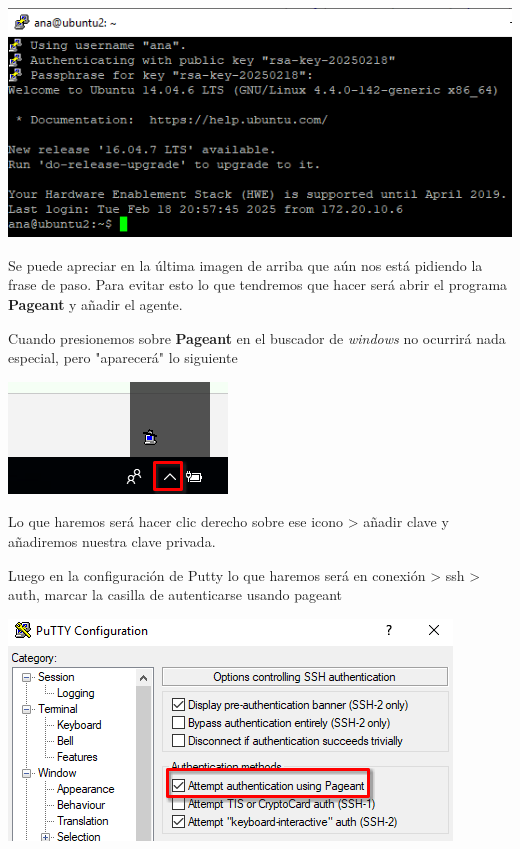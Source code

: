 \documentclass[11pt]{article}
\begin{document}
\begin{center}
\includegraphics[width=.9\linewidth]{./media/putty-connect-3.png}
\end{center}

Se puede apreciar en la última imagen de arriba que aún nos está pidiendo la frase de paso. Para evitar esto lo que tendremos que hacer será abrir el programa \textbf{Pageant} y añadir el agente.

Cuando presionemos sobre \textbf{Pageant} en el buscador de \emph{windows} no ocurrirá nada especial, pero "aparecerá" lo siguiente

\begin{center}
\includegraphics[width=.9\linewidth]{./media/pageant-1.png}
\end{center}

Lo que haremos será hacer clic derecho sobre ese icono > añadir clave y añadiremos nuestra clave privada.

Luego en la configuración de Putty lo que haremos será en conexión > ssh > auth, marcar la casilla de autenticarse usando pageant

\begin{center}
\includegraphics[width=.9\linewidth]{./media/pageant-2.png}
\end{center}
\end{document}
